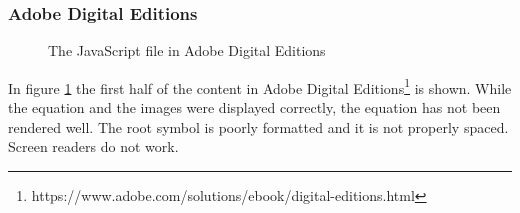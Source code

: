 \subsubsection{Adobe Digital Editions}
\begin{figure}[H]
	\centering
	\caption{The JavaScript file in Adobe Digital Editions}
	\label{fig:adobeDigital}
\end{figure}

In figure \ref{fig:adobeDigital} the first half of the content in Adobe Digital Editions\footnote{https://www.adobe.com/solutions/ebook/digital-editions.html} is shown. While the equation and the images were displayed correctly, the equation has not been rendered well. The root symbol is poorly formatted and it is not properly spaced. Screen readers do not work.


